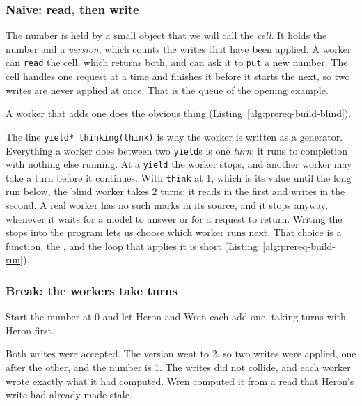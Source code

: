 \subsubsection{Naive: read, then write}

The number is held by a small object that we will call the \emph{cell}. It
holds the number and a \emph{version}, which counts the writes that have
been applied. A worker can \texttt{read} the cell, which returns both, and
can ask it to \texttt{put} a new number. The cell handles one request at a
time and finishes it before it starts the next, so two writes are never
applied at once. That is the queue of the opening example.

A worker that adds one does the obvious thing
(Listing~\ref{alg:prereq-build-blind}).


The line \texttt{yield* thinking(think)} is why the worker is written as a
generator. Everything a worker does between two \texttt{yield}s is one
\emph{turn}: it runs to completion with nothing else running. At a
\texttt{yield} the worker stops, and another worker may take a turn before
it continues. With \texttt{think} at 1, which is its value until the long
run below, the blind worker takes 2 turns: it reads in the first and writes
in the second. A real worker has no such marks in its source, and it stops
anyway, whenever it waits for a model to answer or for a request to return.
Writing the stops into the program lets us choose which worker runs next.
That choice is a function, the , and the loop that
applies it is short (Listing~\ref{alg:prereq-build-run}).


\subsubsection{Break: the workers take turns}

Start the number at 0 and let Heron and Wren each add one, taking turns
with Heron first.


Both writes were accepted. The version went to 2, so two writes were
applied, one after the other, and the number is 1. The writes did not
collide, and each worker wrote exactly what it had computed. Wren computed
it from a read that Heron's write had already made stale.

